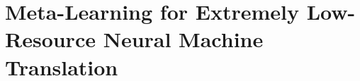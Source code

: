 



\section{Meta-Learning for Extremely Low-Resource Neural Machine Translation}
\label{cp6.sec.maml-mt}

